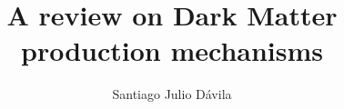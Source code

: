 \documentclass[final,5p,times,twocolumn, nopreprintline]{elsarticle}
\numberwithin{equation}{section}
\begin{document}
\begin{frontmatter}



\title{A review on Dark Matter production mechanisms}


\author[first]{Santiago Julio Dávila}

\begin{abstract}

\end{abstract}



\begin{keyword}



\end{keyword}


\end{frontmatter}
\end{document}
